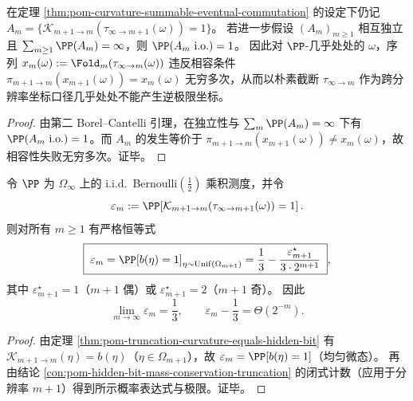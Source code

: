 \begin{proposition}[独立曲率尾部下的朴素坐标几乎处处失效]\label{prop:pom-curvature-independent-divergent}
在定理 \ref{thm:pom-curvature-summable-eventual-commutation} 的设定下仍记 $A_m=\{\mathcal K_{m+1\to m}(\tau_{\infty\to m+1}(\omega))=1\}$。
若进一步假设 $(A_m)_{m\ge 1}$ 相互独立且 $\sum_{m\ge 1}\PP(A_m)=\infty$，则 $\PP(A_m\ \mathrm{i.o.})=1$。
因此对 $\PP$-几乎处处的 $\omega$，序列 $x_m(\omega):=\Fold_m(\tau_{\infty\to m}(\omega))$ 违反相容条件 $\pi_{m+1\to m}(x_{m+1}(\omega))=x_m(\omega)$ 无穷多次，从而以朴素截断 $\tau_{\infty\to m}$ 作为跨分辨率坐标口径几乎处处不能产生逆极限坐标。
\end{proposition}
\begin{proof}
由第二 Borel--Cantelli 引理，在独立性与 $\sum_m\PP(A_m)=\infty$ 下有 $\PP(A_m\ \mathrm{i.o.})=1$。而 $A_m$ 的发生等价于 $\pi_{m+1\to m}(x_{m+1}(\omega))\neq x_m(\omega)$，故相容性失败无穷多次。证毕。
\end{proof}

\begin{corollary}\label{cor:pom-curvature-uniform-limit-closed}
令 \(\PP\) 为 \(\Omega_\infty\) 上的 i.i.d.\ Bernoulli\((\tfrac12)\) 乘积测度，并令
\[
\varepsilon_m:=\PP\!\left[\mathcal K_{m+1\to m}(\tau_{\infty\to m+1}(\omega))=1\right].
\]
则对所有 \(m\ge 1\) 有严格恒等式
\[
\boxed{\;
\varepsilon_m
=\PP[b(\eta)=1]_{\eta\sim\mathrm{Unif}(\Omega_{m+1})}
=\frac13-\frac{\varepsilon_{m+1}^\star}{3\cdot 2^{m+1}}\;},
\]
其中 \(\varepsilon_{m+1}^\star=1\)（\(m{+}1\) 偶）或 \(\varepsilon_{m+1}^\star=2\)（\(m{+}1\) 奇）。
因此
\[
\lim_{m\to\infty}\varepsilon_m=\frac13,\qquad
\varepsilon_m-\frac13=\Theta(2^{-m}).
\]
\end{corollary}
\begin{proof}
由定理 \ref{thm:pom-truncation-curvature-equals-hidden-bit} 有 \(\mathcal K_{m+1\to m}(\eta)=b(\eta)\)（\(\eta\in\Omega_{m+1}\)），故 \(\varepsilon_m=\PP[b(\eta)=1]\)（均匀微态）。
再由结论 \ref{con:pom-hidden-bit-mass-conservation-truncation} 的闭式计数（应用于分辨率 \(m{+}1\)）得到所示概率表达式与极限。证毕。
\end{proof}


